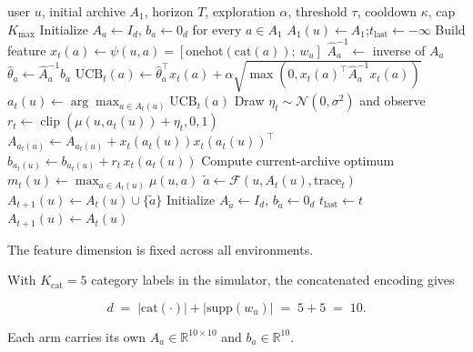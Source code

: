 \documentclass{article} %
\begin{document}
\begin{algorithm}[h]
\caption{HyperRidge-Base (HRB): disjoint LinUCB with a growing archive (per user)}
\label{alg:disjoint-linucb}
\begin{algorithmic}[1]
\Require user $u$, initial archive $A_1$, horizon $T$, exploration $\alpha$, threshold $\tau$, cooldown $\kappa$, cap $K_{\max}$
\State Initialize $A_a \gets I_d$, $b_a \gets 0_d$ for every $a \in A_1$
\State $A_1(u) \gets A_1$;\quad $t_{\text{last}} \gets -\infty$
        \State Build feature $x_t(a) \gets \psi(u, a) = [\mathrm{onehot}(\mathrm{cat}(a));\, w_u]$
        \State $\widehat{A}_a^{-1} \gets$ inverse of $A_a$
        \State $\hat\theta_a \gets \widehat{A}_a^{-1} b_a$
        \State $\mathrm{UCB}_t(a) \gets \hat\theta_a^\top x_t(a) + \alpha \sqrt{\max(0, x_t(a)^\top \widehat{A}_a^{-1} x_t(a))}$
    \EndFor
    \State $a_t(u) \gets \arg\max_{a \in A_t(u)} \mathrm{UCB}_t(a)$
    \State Draw \(\eta_t\sim\mathcal N(0,\sigma^2)\) and observe
    \(r_t\gets\operatorname{clip}(\mu(u,a_t(u))+\eta_t,0,1)\)
    \State $A_{a_t(u)} \gets A_{a_t(u)} + x_t(a_t(u)) x_t(a_t(u))^\top$
    \State $b_{a_t(u)} \gets b_{a_t(u)} + r_t \, x_t(a_t(u))$
    \State Compute current-archive optimum $m_t(u) \gets \max_{a \in A_t(u)} \mu(u, a)$
        \State $\tilde a \gets \mathcal{F}(u, A_t(u), \text{trace}_t)$ 
        \State $A_{t+1}(u) \gets A_t(u) \cup \{\tilde a\}$
        \State Initialize $A_{\tilde a} \gets I_d$, $b_{\tilde a} \gets 0_d$
        \State $t_{\text{last}} \gets t$
    \Else
        \State $A_{t+1}(u) \gets A_t(u)$
    \EndIf
\EndFor
\end{algorithmic}
\end{algorithm}

The feature dimension is fixed across all environments.

With \(K_{\mathrm{cat}}=5\) category labels in the simulator, the concatenated
encoding gives

\begin{equation}
\label{eq:app-impl-d}
d \;=\; |\mathrm{cat}(\cdot)| + |\mathrm{supp}(w_u)| \;=\; 5 + 5 \;=\; 10.
\end{equation}

Each arm carries its own $A_a \in \mathbb{R}^{10\times 10}$ and $b_a \in \mathbb{R}^{10}$.
\end{document}
